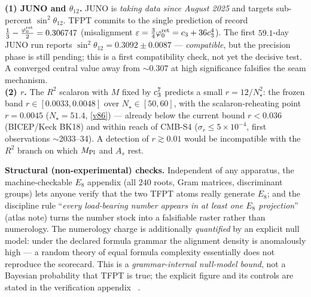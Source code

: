 \begin{winboxnb}
\textbf{(1) JUNO and $\theta_{12}$.} JUNO is \emph{taking data since August 2025} and targets sub-percent
$\sin^2\theta_{12}$. TFPT commits to the single prediction of record
$\tfrac13-\tfrac{\varphi_0^{\mathrm{ret}}}{2}=0.306747$ (misalignment $\varepsilon=\tfrac34\varphi_0^{\mathrm{ret}}=c_3+36c_3^4$). The
first $59.1$-day JUNO run reports $\sin^2\theta_{12}=0.3092\pm0.0087$ --- \emph{compatible}, but the
precision phase is still pending; this is a first compatibility check, not yet the decisive test. A
converged central value away from $\sim0.307$ at high significance falsifies the seam mechanism.\\[2pt]
\textbf{(2) $r$.} The $R^2$ scalaron with $M$ fixed by $c_3^7$ predicts a small $r=12/N_\star^2$:
the frozen band $r\in[0.0033,0.0048]$ over $N_\star\in[50,60]$, with the scalaron-reheating point
$r=0.0045$ ($N_\star{=}51.4$, \vref{v86}) --- already below the current bound $r<0.036$ (BICEP/Keck BK18)
and within reach of CMB-S4 ($\sigma_r\!\le\!5\times10^{-4}$, first observations $\sim$2033--34). A
detection of $r\gtrsim0.01$ would be incompatible with the $R^2$ branch on which $M_{\mathrm{Pl}}$ and $A_s$ rest.
\end{winboxnb}

\noindent\textbf{Structural (non-experimental) checks.} Independent of any apparatus, the
machine-checkable $E_8$ appendix (all $240$ roots, Gram matrices, discriminant groups) lets anyone verify
that the two TFPT atoms really generate $E_8$; and the discipline rule ``\emph{every load-bearing number
appears in at least one $E_8$ projection}'' (atlas note) turns the number stock into a falsifiable raster
rather than numerology. The numerology charge is additionally \emph{quantified} by an explicit null model:
under the declared formula grammar the alignment density is anomalously high --- a random theory of equal
formula complexity essentially does not reproduce the scorecard. This is a \emph{grammar-internal null-model
bound}, not a Bayesian probability that TFPT is true; the explicit figure and its controls are stated in the
verification appendix \mE\ .

